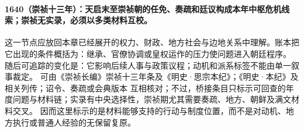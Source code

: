 \paragraph{1640（崇祯十三年）：天启末至崇祯朝的任免、奏疏和廷议构成本年中枢危机线索；崇祯无实录，必须以多类材料互校。} 这一节点应放回本章已经展开的权力、财政、地方社会与边地关系中理解。账本把它出现的条件概括为：继承、官僚协调或皇权运作的压力使问题进入朝廷程序。 随后可追踪的变化是：它影响后续人事与政策议程；动机和派系标签不能由单一叙事裁定。 可由《崇祯长编》崇祯十三年条及《明史·思宗本纪》；《明史·本纪》及相关列传；诏令、奏疏或会典版本 互相核对；不过，桥接条目只标示可回查的年度问题与材料链；实录有中央选择性，崇祯期尤其需要奏疏、地方、朝鲜及满文材料交叉。 因而这里标示的是材料能够支持的行动与制度位置，而不是对动机、地方执行或普通人经验的无保留复原。
